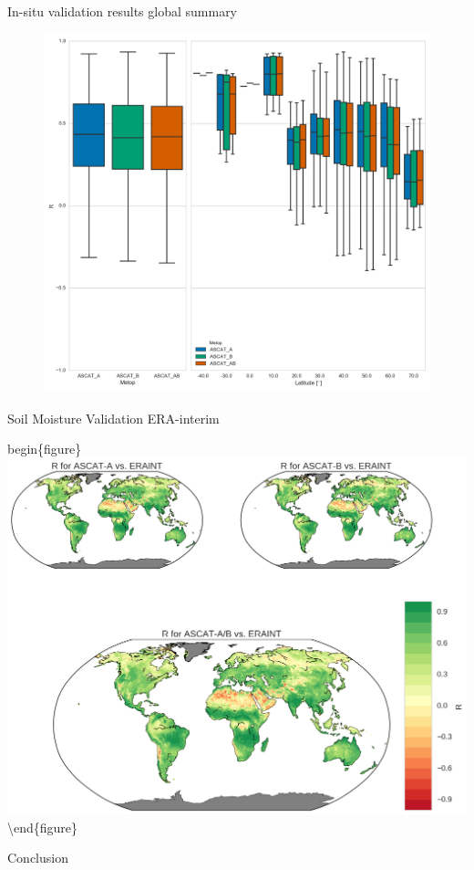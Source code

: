 \documentclass[10pt,ignorenonframetext,xcolor={dvipsnames, table}]{beamer}
\begin{document}
\begin{frame}{In-situ validation results global summary}

\begin{figure}
\includegraphics[height=0.8\textheight,keepaspectratio]{./figures/boxplot_ISMN_ASCAT_all_latitude.png}
\end{figure}

\end{frame}

\begin{frame}{Soil Moisture Validation ERA-interim}

begin\{figure\}
\includegraphics[width=0.9/textwidth]{./figures/ASCAT_ERAINT_maps.png}
\textbackslash{}end\{figure\}

\end{frame}

\begin{frame}{Conclusion}

\end{frame}
\end{document}
